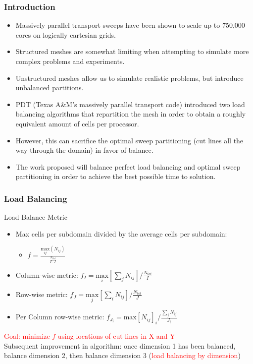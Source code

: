 \documentclass[xcolor={usenames,dvipsnames,svgnames,table}]{beamer}
\newcommand{\tcr}[1]{\textcolor{red}{#1}}
\begin{document}
\begin{frame}[t]\frametitle{Introduction}
\begin{block}{}
\begin{itemize}
	\item Massively parallel transport sweeps have been shown to scale up to 750,000 cores on logically cartesian grids.
	\item Structured meshes are somewhat limiting when attempting to simulate more complex problems and experiments.
	\item Unstructured meshes allow us to simulate realistic problems, but introduce unbalanced partitions. 
	\item PDT (Texas A\&M's massively parallel transport code) introduced two load balancing algorithms that repartition the mesh in order to obtain a roughly equivalent amount of cells per processor. 
	\item However, this can sacrifice the optimal sweep partitioning (cut lines all the way through the domain) in favor of balance. 
	\item The work proposed will balance perfect load balancing and optimal sweep partitioning in order to achieve the best possible time to solution.
\end{itemize}
\end{block}
\end{frame}

\begin{frame}[t]\frametitle{Load Balancing}
\begin{block}{Load Balance Metric}
  \begin{itemize}
    \item Max cells per subdomain divided by the average cells per subdomain:
      \begin{itemize}
        \item$f =\frac{\underset{ij}{\text{max}}(N_{ij})}{\frac{N_{tot}}{I\cdot J}}$
      \end{itemize}
    \item Column-wise metric: $f_I = \underset{i}{\text{max}}[\sum_{j} N_{ij}]/\frac{N_{tot}}{I}$
    \item Row-wise metric: $f_J = \underset{j}{\text{max}}[\sum_{i} N_{ij}]/\frac{N_{tot}}{J}$
    \item Per Column row-wise metric: $f_{J_i} = \text{max}[N_{ij}]_i/\frac{\sum_{j}N_{ij}}{J_i}$
  \end{itemize}		
  \tcr{Goal: minimize $f$ using locations of cut lines in X and Y}\\
    
  Subsequent improvement in algorithm: once dimension 1 has been balanced, balance dimension 2, then balance dimension 3 (\tcr{load balancing by dimension})
\end{block}
\end{frame}
\end{document}
